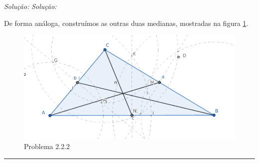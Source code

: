 \documentclass[a4paper, 11pt]{book}
\newenvironment{solution}
    {\textit{Solução:}}
    {}
\begin{document}
\begin{solution}
\begin{solution}
\begin{enumerate}[\textbf{\arabic*}:]
    \end{enumerate}
    De forma análoga, construímos as outras duas medianas, mostradas na figura \ref{fig:2.2.2r}.
    \begin{figure}[H]
        \centering
        \includegraphics[scale=0.4]{imagens/2_2_2r.png}
        \caption{Problema 2.2.2}
        \label{fig:2.2.2r}
    \end{figure}
\end{solution} 
\noindent\rule{7in}{2.8pt}\\



\end{solution}
\end{document}
